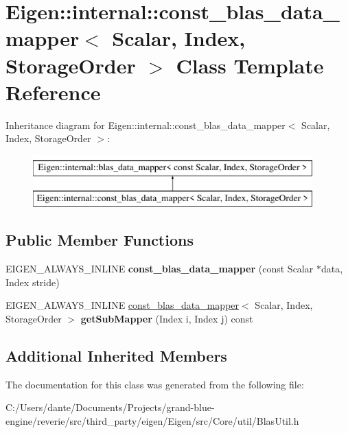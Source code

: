\hypertarget{class_eigen_1_1internal_1_1const__blas__data__mapper}{}\section{Eigen\+::internal\+::const\+\_\+blas\+\_\+data\+\_\+mapper$<$ Scalar, Index, Storage\+Order $>$ Class Template Reference}
\label{class_eigen_1_1internal_1_1const__blas__data__mapper}
Inheritance diagram for Eigen\+::internal\+::const\+\_\+blas\+\_\+data\+\_\+mapper$<$ Scalar, Index, Storage\+Order $>$\+:\begin{figure}[H]
\begin{center}
\leavevmode
\includegraphics[height=2.000000cm]{class_eigen_1_1internal_1_1const__blas__data__mapper}
\end{center}
\end{figure}
\subsection*{Public Member Functions}
\begin{DoxyCompactItemize}
\item 
\mbox{\label{class_eigen_1_1internal_1_1const__blas__data__mapper_ae18b6a511e6f40baf1ec5936ee16e248}} 
E\+I\+G\+E\+N\+\_\+\+A\+L\+W\+A\+Y\+S\+\_\+\+I\+N\+L\+I\+NE {\bfseries const\+\_\+blas\+\_\+data\+\_\+mapper} (const Scalar $\ast$data, Index stride)
\item 
\mbox{\label{class_eigen_1_1internal_1_1const__blas__data__mapper_ae630dbeda283542d68ee615c2cdf4d53}} 
E\+I\+G\+E\+N\+\_\+\+A\+L\+W\+A\+Y\+S\+\_\+\+I\+N\+L\+I\+NE \mbox{\hyperlink{class_eigen_1_1internal_1_1const__blas__data__mapper}{const\+\_\+blas\+\_\+data\+\_\+mapper}}$<$ Scalar, Index, Storage\+Order $>$ {\bfseries get\+Sub\+Mapper} (Index i, Index j) const
\end{DoxyCompactItemize}
\subsection*{Additional Inherited Members}


The documentation for this class was generated from the following file\+:\begin{DoxyCompactItemize}
\item 
C\+:/\+Users/dante/\+Documents/\+Projects/grand-\/blue-\/engine/reverie/src/third\+\_\+party/eigen/\+Eigen/src/\+Core/util/Blas\+Util.\+h\end{DoxyCompactItemize}
